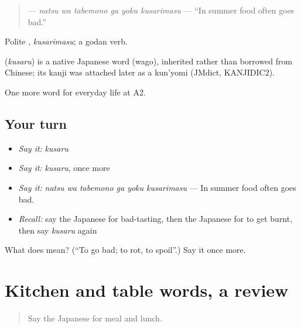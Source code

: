 \begin{quote}
\textbf{   } — \emph{natsu wa tabemono ga yoku kusarimasu} — \textquotedblleft{}In summer food often goes bad.\textquotedblright{}
\end{quote}

Polite \textbf{}, \emph{kusarimasu}; a godan verb.

\begin{cousinweb}
\textbf{} (\emph{kusaru}) is a native Japanese word (wago), inherited rather than borrowed from Chinese; its kanji was attached later as a kun'yomi (JMdict, KANJIDIC2).
\end{cousinweb}

\begin{grammarlens}[title={What you've built}]
One more word for everyday life at A2.
\end{grammarlens}

\subsection*{Your turn}
\begin{itemize}
\raggedright
  \item \emph{Say it:} \emph{kusaru}
  \item \emph{Say it:} \emph{kusaru}, once more
  \item \emph{Say it:} \emph{natsu wa tabemono ga yoku kusarimasu} — In summer food often goes bad.
  \item \emph{Recall:} say the Japanese for bad-tasting, then the Japanese for to get burnt, then say \emph{kusaru} again
\end{itemize}

\begin{tcolorbox}[breakable,colback=teal!4,colframe=teal!35!black,title={Before you move on}]
What does  mean? (\textquotedblleft{}To go bad; to rot, to spoil\textquotedblright{}.) Say it once more.
\end{tcolorbox}
\section[(dialogue)]{Kitchen and table words, a review}

\label{lesson:JA-R177-review-172-177}



\begin{quote}
Say the Japanese for meal and lunch.
\end{quote}

